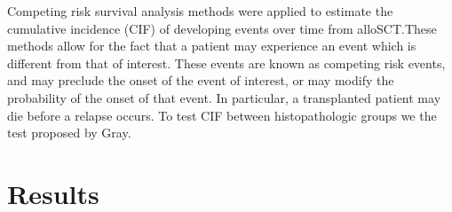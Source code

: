 \documentclass[a4paper,11pt] {article}
\begin{document}
Competing risk survival analysis methods were applied to estimate the cumulative incidence (CIF) of developing events over time from alloSCT.These methods allow for the fact that a patient may experience an event which is different from that of interest. These events are known as competing risk events, and may preclude the onset of the event of interest, or may modify the probability of the onset of that event. In particular, a transplanted patient may die before a relapse occurs.
To test CIF between histopathologic groups we the test proposed by Gray. 

\pagebreak[4]
\section{Results}
\end{document}
